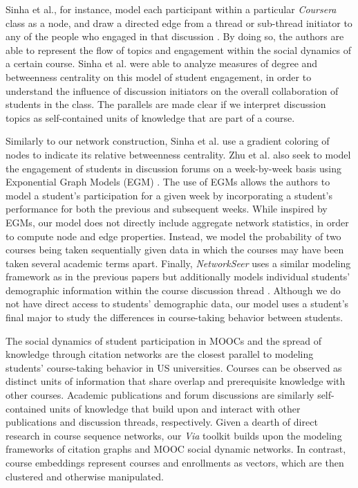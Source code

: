 Sinha et al., for instance, model each participant within a particular \textit{Coursera} class as a node, and draw a directed edge from a thread or sub-thread initiator to any of the people who engaged in that discussion \cite{Sinha2014}. By doing so, the authors are able to represent the flow of topics and engagement within the social dynamics of a certain course. Sinha et al. were able to analyze measures of degree and betweenness centrality on this model of student engagement, in order to understand the influence of discussion initiators on the overall collaboration of students in the class. The parallels are made clear if we interpret discussion topics as self-contained units of knowledge that are part of a course. 

Similarly to our network construction, Sinha et al. use a gradient
coloring of nodes to indicate its relative betweenness
centrality. Zhu et al. also seek to model the engagement of
students in discussion forums on a week-by-week basis using
Exponential Graph Models (EGM) \cite{Zhu2016}. The use of EGMs allows
the authors to model a student's participation for a given week by
incorporating a student's performance for both the previous and
subsequent weeks. While inspired by EGMs, our model does not directly
include aggregate network statistics, in order to compute node and edge
properties. Instead, we model the probability of two courses
being taken sequentially given data in which the courses may have been
taken several academic terms apart. Finally, \textit{NetworkSeer} uses a similar modeling framework as in the previous papers but additionally models individual students' demographic information within the course discussion thread \cite{Wu2016}. Although we do not have direct access to students' demographic data, our model uses a student's final major to study the differences in course-taking behavior between students.


The social dynamics of student participation in MOOCs and the spread
of knowledge through citation networks are the closest parallel to
modeling students' course-taking behavior in US universities. Courses can
be observed as distinct units of information that share overlap and
prerequisite knowledge with other courses. Academic publications and
forum discussions are similarly self-contained units of knowledge that
build upon and interact with other publications and discussion
threads, respectively. Given a dearth of direct research in course
sequence networks, our \textit{Via} toolkit builds upon the modeling
frameworks of citation graphs and MOOC social dynamic networks. In
contrast, course embeddings \cite{pard2018} represent courses and
enrollments as vectors, which are then clustered and otherwise
manipulated.

